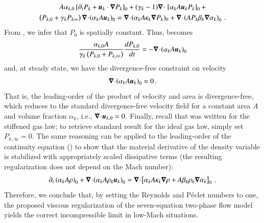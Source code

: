 %
\begin{multline}\label{eq:asympt_equ3_ener}
A \alpha_{k,0} \left[ \partial_t  P_k  + \mbold u_k \cdot \grad  P_k \right]_0 + 
(\gamma_k-1) \div \ \left[ \alpha_k A \mbold u_k P_k \right]_0 +\\ 
\left( P_{k,0} +  \gamma_k P_{k\infty} \right) \div  \left(\alpha_k A \mbold u_k \right )_0 = 
\div (\alpha_k A \kappa_k \grad P_k)_0 + \div \left( A P_k \beta_k \grad \alpha_k \right)_0 \,.
\end{multline}
%
From , we infer that $P_0$ is spatially constant. Thus,  becomes
%
\begin{equation}\label{eq:div_free_energy}
\frac{\alpha_{k,0}  A}{\gamma_k\left( P_{k,0} + P_{k,\infty} \right)} \frac{d P_{k,0}}{dt} = - \boldsymbol\nabla\! \cdot \! \left( \alpha_k A \boldsymbol u_k \right)_0 
\end{equation}
%
and, at steady state, we have the divergence-free constraint on velocity
%
\begin{equation}
\boldsymbol\nabla\! \cdot \! \left( \alpha_k A \boldsymbol u_k \right)_0  = 0 \, .
\end{equation}
%
That is, the leading-order of the product of velocity and area is divergence-free, which reduces to the standard divergence-free 
velocity field for a constant area $A$ and volume fraction $\alpha_k$, i.e., $\boldsymbol\nabla\! \cdot \! \boldsymbol u_{k,0}=0$. Finally, recall that 
 was written for the stiffened gas law; to retrieve standard result for the ideal gas law, simply set $P_{k,\infty}=0$. 
%
The same reasoning can be applied to the leading-order 
of the continuity equation () to show that the material derivative of the density variable is stabilized with 
appropriately scaled dissipative terms (the resulting regularization does not depend on the Mach number):
\begin{equation}
\partial_t \left( \alpha_k A \rho\right)_0 + \boldsymbol\nabla\! \cdot \! \left( \alpha_k A \rho_k \boldsymbol u_k \right)_0 =
\boldsymbol\nabla\! \cdot \! \left[ \alpha_k A \kappa_k \boldsymbol\nabla \rho + A \beta_k \rho_k \boldsymbol\nabla \alpha_k \right]_0 \, .
\end{equation}
%
Therefore, we conclude that, by setting the Reynolds and P\'eclet numbers to one, the proposed viscous regularization
of the seven-equation two-phase flow model yields the correct incompressible limit in low-Mach situations.
%
